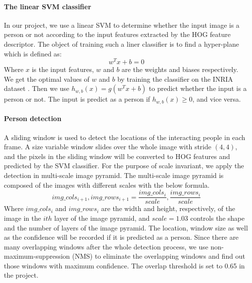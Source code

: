 \paragraph*{The linear SVM classifier}
In our project, we use a linear SVM to determine whether the input image is a person or not according to the input features extracted by the HOG feature descriptor. The object of training such a liner classifier is to find a hyper-plane which is defined as:
\begin{equation}
	w^Tx + b = 0
\end{equation}
Where \(x\) is the input features, \(w\) and \(b\) are the weights and biases respectively. We get the optimal values of \(w\) and \(b\) by training the classifier on the INRIA dataset \cite{inria_person}. Then we use \(h_{w,b}(x) = g(w^Tx+b)\) to predict whether the input is a person or not. The input is predict as a person if \(h_{w,b}(x) \geq 0 \), and vice versa.

\paragraph*{Person detection} 
A sliding window is used to detect the locations of the interacting people in each frame. A size variable window slides over the whole image with stride \((4,4)\), and the pixels in the sliding window will be converted to HOG features and predicted by the SVM classifier. For the purpose of scale invariant, we apply the detection in multi-scale image pyramid. The multi-scale image pyramid is composed of the images with different scales with the below formula. 
\begin{equation}
	img\_cols_{i+1}, img\_rows_{i+1} = \frac{img\_cols_i}{scale}, \frac{img\_rows_i}{scale}
\end{equation}
Where \(img\_cols_i\) and \(img\_rows_i\) are the width and height, respectively, of the image in the \(ith\) layer of the image pyramid, and \(scale = 1.03\) controls the shape and the number of layers of the image pyramid. 
The location, window size as well as the confidence will be recorded if it is predicted as a person. Since there are many overlapping windows after the whole detection process, we use non-maximum-suppression (NMS) to eliminate the overlapping windows and find out those windows with maximum confidence. The overlap threshold is set to 0.65 in the project. 

